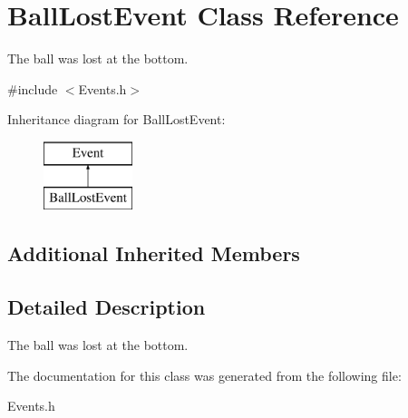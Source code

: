 \hypertarget{classBallLostEvent}{\section{Ball\-Lost\-Event Class Reference}
\label{classBallLostEvent}
}


The ball was lost at the bottom.  




{\ttfamily \#include $<$Events.\-h$>$}

Inheritance diagram for Ball\-Lost\-Event\-:\begin{figure}[H]
\begin{center}
\leavevmode
\includegraphics[height=2.000000cm]{classBallLostEvent}
\end{center}
\end{figure}
\subsection*{Additional Inherited Members}


\subsection{Detailed Description}
The ball was lost at the bottom. 

The documentation for this class was generated from the following file\-:\begin{DoxyCompactItemize}
\item 
Events.\-h\end{DoxyCompactItemize}
